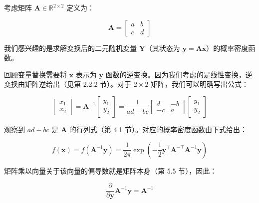 \begin{notebox}
考虑矩阵 $ \boldsymbol{A} \in \mathbb{R}^{2 \times 2} $ 定义为：

\begin{equation}
\boldsymbol{A} = \begin{bmatrix} a & b \\ c & d \end{bmatrix}
\tag{6.146}\label{eq:6-146}
\end{equation}

我们感兴趣的是求解变换后的二元随机变量 $ \boldsymbol{Y} $（其状态为 $ \boldsymbol{y} = \boldsymbol{A} \boldsymbol{x} $）的概率密度函数。
\end{notebox}

\begin{notebox}
回顾变量替换需要将 $ \boldsymbol{x} $ 表示为 $ \boldsymbol{y} $ 函数的逆变换。因为我们考虑的是线性变换，逆变换由矩阵逆给出（见第 2.2.2 节）。对于 $ 2 \times 2 $ 矩阵，我们可以明确写出公式：

\begin{equation}
\begin{bmatrix} x_1 \\ x_2 \end{bmatrix} = \boldsymbol{A}^{-1} \begin{bmatrix} y_1 \\ y_2 \end{bmatrix} = \frac{1}{ad - bc} \begin{bmatrix} d & -b \\ -c & a \end{bmatrix} \begin{bmatrix} y_1 \\ y_2 \end{bmatrix}
\tag{6.147}\label{eq:6-147}
\end{equation}

观察到 $ ad - bc $ 是 $ \boldsymbol{A} $ 的行列式（第 4.1 节）。对应的概率密度函数由下式给出：

\begin{equation}
f(\boldsymbol{x}) = f(\boldsymbol{A}^{-1}\boldsymbol{y}) = \frac{1}{2\pi} \exp \left( -\frac{1}{2} \boldsymbol{y}^\top \boldsymbol{A}^{-\top} \boldsymbol{A}^{-1} \boldsymbol{y} \right)
\tag{6.148}\label{eq:6-148}
\end{equation}

矩阵乘以向量关于该向量的偏导数就是矩阵本身（第 5.5 节），因此：

\begin{equation}
\frac{\partial}{\partial \boldsymbol{y}} \boldsymbol{A}^{-1}\boldsymbol{y} = \boldsymbol{A}^{-1}
\tag{6.149}\label{eq:6-149}
\end{equation}


\end{notebox}
